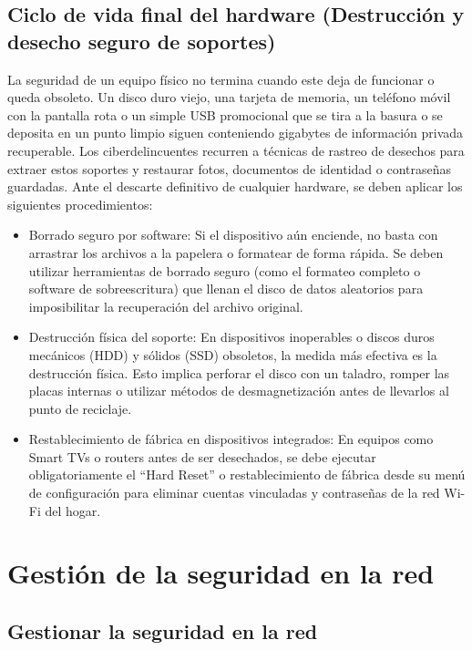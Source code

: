 \documentclass[
  spanish,
  a4paper,
  openany]{book}
\begin{document}
\section{Ciclo de vida final del hardware (Destrucción y desecho seguro de soportes)}\label{ciclo-de-vida-final-del-hardware-destrucciuxf3n-y-desecho-seguro-de-soportes}

La seguridad de un equipo físico no termina cuando este deja de funcionar o queda obsoleto. Un disco duro viejo, una tarjeta de memoria, un teléfono móvil con la pantalla rota o un simple USB promocional que se tira a la basura o se deposita en un punto limpio siguen conteniendo gigabytes de información privada recuperable. Los ciberdelincuentes recurren a técnicas de rastreo de desechos para extraer estos soportes y restaurar fotos, documentos de identidad o contraseñas guardadas. Ante el descarte definitivo de cualquier hardware, se deben aplicar los siguientes procedimientos:

\begin{itemize}
\item
  Borrado seguro por software: Si el dispositivo aún enciende, no basta con arrastrar los archivos a la papelera o formatear de forma rápida. Se deben utilizar herramientas de borrado seguro (como el formateo completo o software de sobreescritura) que llenan el disco de datos aleatorios para imposibilitar la recuperación del archivo original.
\item
  Destrucción física del soporte: En dispositivos inoperables o discos duros mecánicos (HDD) y sólidos (SSD) obsoletos, la medida más efectiva es la destrucción física. Esto implica perforar el disco con un taladro, romper las placas internas o utilizar métodos de desmagnetización antes de llevarlos al punto de reciclaje.
\item
  Restablecimiento de fábrica en dispositivos integrados: En equipos como Smart TVs o routers antes de ser desechados, se debe ejecutar obligatoriamente el ``Hard Reset'' o restablecimiento de fábrica desde su menú de configuración para eliminar cuentas vinculadas y contraseñas de la red Wi-Fi del hogar.
\end{itemize}

\chapter{Gestión de la seguridad en la red}\label{gestiuxf3n-de-la-seguridad-en-la-red}

\section{Gestionar la seguridad en la red}\label{gestionar-la-seguridad-en-la-red}
\end{document}
